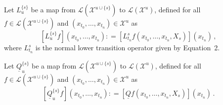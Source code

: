 \documentclass[a4paper,reqno]{amsart}
\newcommand{\states}{\mathcal{X}}
\newcommand{\gambles}{\mathcal{L}}
\newcommand{\lrate}{\underline{Q}}
\newcommand{\coloneqq}{:\!=}
\begin{document}
Let $L_u^{\{s\}}$ be a map from $\gambles(\states^{u\cup\{s\}})$ to $\gambles(\states^u)$, defined for all $f\in\gambles(\states^{u\cup\{s\}})$ and $(x_{t_0},\ldots,x_{t_n})\in\states^u$ as
\begin{equation*}
\left[L_u^{\{s\}}f\right](x_{t_0},\ldots,x_{t_n}) \coloneqq \left[L_{t_n}^s f(x_{t_0},\ldots,x_{t_{n}},X_s)\right](x_{t_n})\,,
\end{equation*}
where $L_{t_n}^s$ is the normal lower transition operator given by Equation~2.

Let $\lrate_{u}^{\{s\}}$ be a map from $\gambles(\states^{u\cup\{s\}})$ to $\gambles(\states^u)$, defined for all $f\in\gambles(\states^{u\cup\{s\}})$ and $(x_{t_0},\ldots,x_{t_n})\in\states^u$ as
\begin{equation*}
\left[\lrate_u^{\{s\}}f\right](x_{t_0},\ldots,x_{t_n}) \coloneqq \left[\lrate f(x_{t_0},\ldots,x_{t_{n}},X_s)\right](x_{t_n})\,.
\end{equation*}
\end{document}
